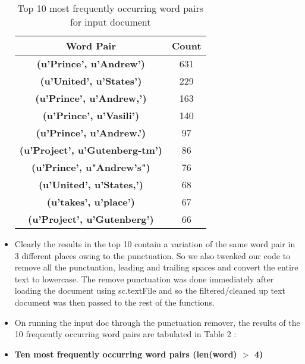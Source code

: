 \documentclass[11pt]{article}
\begin{document}
\begin{itemize}
	\begin{table}[h]
		\centering
		\begin{tabular}{|c|c|}
			\hline
			\textbf{Word Pair}  & \textbf{Count}   \\
			\hline
			\textbf{(u'Prince', u'Andrew')} &  631    \\
			\hline
			\textbf{(u'United', u'States')} &  229    \\
			\hline
			\textbf{(u'Prince', u'Andrew,')}  &  163   \\
			\hline
			\textbf{(u'Prince', u'Vasili')}  &  140   \\
			\hline
			\textbf{(u'Prince', u'Andrew.')}  &  97  \\
			\hline
			\textbf{(u'Project', u'Gutenberg-tm')}  &  86   \\
			\hline
			\textbf{(u'Prince', u"Andrew's")}  &  76   \\
			\hline
			\textbf{(u'United', u'States,')}  &  68  \\
			\hline
			\textbf{(u'takes', u'place')}  &  67   \\
			\hline
			\textbf{(u'Project', u'Gutenberg')}  &  66  \\
			\hline
		\end{tabular}
		\caption{Top 10 most frequently occurring word pairs for input document}
		\label{t1}
	\end{table}


\item [] Clearly the results in the top 10 contain a variation of the same word pair in 3 different places owing to the punctuation. So we also tweaked our code to remove all the punctuation, leading and trailing spaces and convert the entire text to lowercase. The remove punctuation was done immediately after loading the document using sc.textFile and so the filtered/cleaned up text document was then passed to the rest of the functions.
\item [] On running the input doc through the punctuation remover, the results of the 10 frequently occurring word pairs are tabulated in Table 2 : 

\item[] \textbf{Ten most frequently occurring word pairs (len(word) $>$ 4) }
	

\end{itemize}
\end{document}

